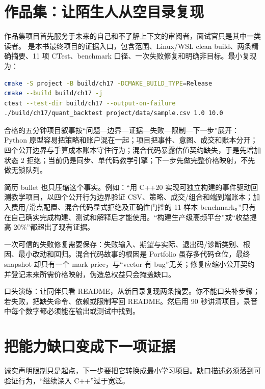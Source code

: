 \section{作品集：让陌生人从空目录复现}

作品集项目首先服务于未来的自己和不了解上下文的审阅者，面试官只是其中一类读者。 是本书最终项目的证据入口，包含范围、Linux/WSL clean build、两条精确摘要、11 项 CTest、benchmark 口径、一次失败修复和明确非目标。最小复现为：

\begin{lstlisting}[language=bash,numbers=none]
cmake -S project -B build/ch17 -DCMAKE_BUILD_TYPE=Release
cmake --build build/ch17 -j
ctest --test-dir build/ch17 --output-on-failure
./build/ch17/quant_backtest project/data/sample.csv 1.0 10.0
\end{lstlisting}

合格的五分钟项目叙事按“问题—边界—证据—失败—限制—下一步”展开：Python 原型容易把策略和账户混在一起；项目把事件、意图、成交和账本分开；四个公开边界与手算成本账本守住行为；混合代码暴露估值契约缺失，于是先增加状态 2 拒绝；当前仍是同步、单代码教学引擎；下一步先做完整价格映射，不先做无锁队列。

简历 bullet 也只压缩这个事实。例如：“用 C++20 实现可独立构建的事件驱动回测教学项目，以四个公开行为边界验证 CSV、策略、成交/组合和端到端账本；加入费用/滑点配置、混合代码显式拒绝及正确性门控的 11 样本 benchmark。”只有在自己确实完成构建、测试和解释后才能使用。“构建生产级高频平台”或“收益提高 20\%”都超出了现有证据。

一次可信的失败修复需要保存：失败输入、期望与实际、退出码/诊断类别、根因、最小改动和回归。混合代码故事的根因是 Portfolio 虽存多代码仓位，最终 snapshot 却只有一个 mark price，与“vector 有 bug”无关；修复应缩小公开契约并登记未来所需价格映射，伪造总权益只会掩盖缺口。

口头演练：让同伴只看 README，从新目录复现两条摘要。你不能口头补步骤；若失败，把缺失命令、依赖或限制写回 README。然后用 90 秒讲清项目，录音中每个数字都必须能在输出或测试中找到。

\section{把能力缺口变成下一项证据}

诚实声明限制只是起点，下一步要把它转换成最小学习项目。缺口描述必须落到可验证行为，“继续深入 C++”过于宽泛。

